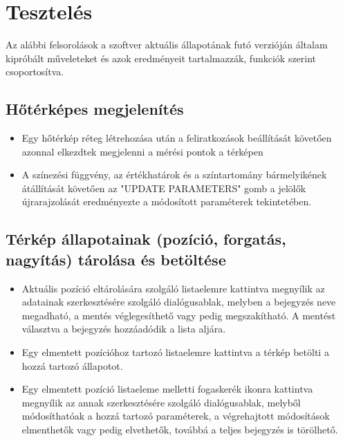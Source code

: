 \section{Tesztelés}

Az alábbi felsorolások a szoftver aktuális állapotának futó verzióján általam
kipróbált műveleteket és azok eredményeit tartalmazzák, funkciók szerint
csoportosítva.

\subsection{Hőtérképes megjelenítés}

\begin{itemize}

  \item Egy hőtérkép réteg létrehozása után a feliratkozások beállítását
  követően azonnal elkezdtek megjelenni a mérési pontok a térképen

  \item A színezési függvény, az értékhatárok és a színtartomány bármelyikének
  átállítását követően az "UPDATE PARAMETERS" gomb a jelölők újrarajzolását
  eredményezte a módosított paraméterek tekintetében.

\end{itemize}


\subsection{Térkép állapotainak (pozíció, forgatás, nagyítás) tárolása és betöltése}

\begin{itemize}

  \item Aktuális pozíció eltárolására szolgáló listaelemre kattintva megnyílik
  az adatainak szerkesztésére szolgáló dialógusablak, melyben a bejegyzés neve
  megadható, a mentés véglegesíthető vagy pedig megszakítható. A mentést
  választva a bejegyzés hozzáadódik a lista aljára.

  \item Egy elmentett pozícióhoz tartozó listaelemre kattintva a térkép betölti
  a hozzá tartozó állapotot.

  \item Egy elmentett pozíció listaeleme melletti fogaskerék ikonra kattintva
  megnyílik az annak szerkesztésére szolgáló dialógusablak, melyből
  módosíthatóak a hozzá tartozó paraméterek, a végrehajtott módosítások
  elmenthetők vagy pedig elvethetők, továbbá a teljes bejegyzés is törölhető.

\end{itemize}


